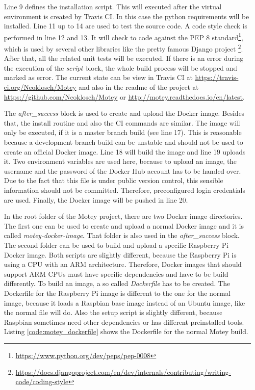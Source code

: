 Line 9 defines the installation script.
This will executed after the virtual environment is created by Travis CI.
In this case the python requirements will be installed.
Line 11 up to 14 are used to test the source code.
A code style check is performed in line 12 and 13.
It will check to code against the \ac{PEP} 8 standard\footnote{\url{https://www.python.org/dev/peps/pep-0008}}, which is used by several other libraries like the pretty famous Django project{ \footnote{\url{https://docs.djangoproject.com/en/dev/internals/contributing/writing-code/coding-style}}}.
After that, all the related unit tests will be executed.
If there is an error during the execution of the \textit{script} block, the whole build process will be stopped and marked as error.
The current state can be view in Travis CI at \url{https://travis-ci.org/Neoklosch/Motey} and also in the readme of the project at \url{https://github.com/Neoklosch/Motey} or \url{http://motey.readthedocs.io/en/latest}.\newline

The \textit{after\_success} block is used to create and upload the Docker image.
Besides that, the install routine and also the \ac{CI} commands are similar.
The image will only be executed, if it is a master branch build (see line 17).
This is reasonable because a development branch build can be unstable and should not be used to create an official Docker image.
Line 18 will build the image and line 19 uploads it.
Two environment variables are used here, because to upload an image, the username and the password of the Docker Hub account has to be handed over.
Due to the fact that this file is under public version control, this sensible information should not be committed.
Therefore, preconfigured login credentials are used.
Finally, the Docker image will be pushed in line 20.\newline

In the root folder of the Motey project, there are two Docker image directories.
The first one can be used to create and upload a normal Docker image and it is called \textit{motey-docker-image}.
That folder is also used in the \textit{after\_success} block.
The second folder can be used to build and upload a specific Raspberry Pi Docker image.
Both scripts are slightly different, because the Raspberry Pi is using a \ac{CPU} with an ARM architecture.
Therefore, Docker images that should support ARM \acp{CPU} must have specific dependencies and have to be build differently.
To build an image, a so called \textit{Dockerfile} has to be created.
The Dockerfile for the Raspberry Pi image is different to the one for the normal image, because it loads a Raspbian base image instead of an Ubuntu image, like the normal file will do.
Also the setup script is slightly different, because Raspbian sometimes need other dependencies or has different preinstalled tools.
Listing \ref{code:motey_dockerfile} shows the Dockerfile for the normal Motey build.\newline

